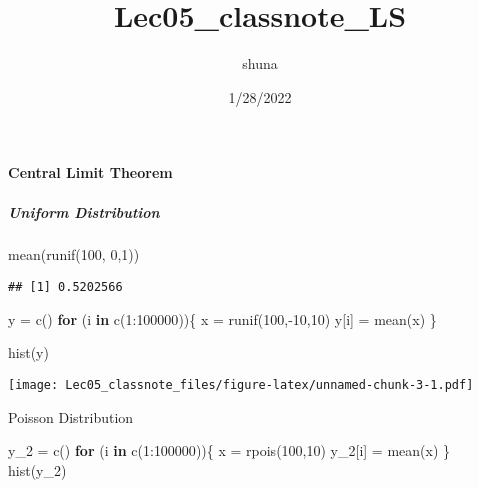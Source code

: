 \documentclass[
]{article}
\title{Lec05\_classnote\_LS}
\author{shuna}
\date{1/28/2022}
\newenvironment{Shaded}{\begin{snugshade}}{\end{snugshade}}
\newcommand{\ControlFlowTok}[1]{\textcolor[rgb]{0.13,0.29,0.53}{\textbf{#1}}}
\newcommand{\DecValTok}[1]{\textcolor[rgb]{0.00,0.00,0.81}{#1}}
\newcommand{\FunctionTok}[1]{\textcolor[rgb]{0.00,0.00,0.00}{#1}}
\newcommand{\NormalTok}[1]{#1}
\newcommand{\OtherTok}[1]{\textcolor[rgb]{0.56,0.35,0.01}{#1}}
\newcommand{\SpecialCharTok}[1]{\textcolor[rgb]{0.00,0.00,0.00}{#1}}
\begin{document}
\maketitle

\hypertarget{central-limit-theorem}{%
\paragraph{Central Limit Theorem}\label{central-limit-theorem}}

\hypertarget{uniform-distribution}{%
\subparagraph{Uniform Distribution}\label{uniform-distribution}}

\begin{Shaded}
\begin{Highlighting}[]
\FunctionTok{mean}\NormalTok{(}\FunctionTok{runif}\NormalTok{(}\DecValTok{100}\NormalTok{, }\DecValTok{0}\NormalTok{,}\DecValTok{1}\NormalTok{))}
\end{Highlighting}
\end{Shaded}

\begin{verbatim}
## [1] 0.5202566
\end{verbatim}

\begin{Shaded}
\begin{Highlighting}[]
\NormalTok{y }\OtherTok{=} \FunctionTok{c}\NormalTok{()}
\ControlFlowTok{for}\NormalTok{ (i }\ControlFlowTok{in} \FunctionTok{c}\NormalTok{(}\DecValTok{1}\SpecialCharTok{:}\DecValTok{100000}\NormalTok{))\{}
\NormalTok{  x }\OtherTok{=} \FunctionTok{runif}\NormalTok{(}\DecValTok{100}\NormalTok{,}\SpecialCharTok{{-}}\DecValTok{10}\NormalTok{,}\DecValTok{10}\NormalTok{)}
\NormalTok{  y[i] }\OtherTok{=} \FunctionTok{mean}\NormalTok{(x)}
\NormalTok{\}}
\end{Highlighting}
\end{Shaded}

\begin{Shaded}
\begin{Highlighting}[]
\FunctionTok{hist}\NormalTok{(y)}
\end{Highlighting}
\end{Shaded}

\texttt{[image: Lec05\_classnote\_files/figure-latex/unnamed-chunk-3-1.pdf]}

Poisson Distribution

\begin{Shaded}
\begin{Highlighting}[]
\NormalTok{y\_2 }\OtherTok{=} \FunctionTok{c}\NormalTok{()}
\ControlFlowTok{for}\NormalTok{ (i }\ControlFlowTok{in} \FunctionTok{c}\NormalTok{(}\DecValTok{1}\SpecialCharTok{:}\DecValTok{100000}\NormalTok{))\{}
\NormalTok{  x }\OtherTok{=} \FunctionTok{rpois}\NormalTok{(}\DecValTok{100}\NormalTok{,}\DecValTok{10}\NormalTok{)}
\NormalTok{  y\_2[i] }\OtherTok{=} \FunctionTok{mean}\NormalTok{(x)}
\NormalTok{\}}
\FunctionTok{hist}\NormalTok{(y\_2)}
\end{Highlighting}
\end{Shaded}
\end{document}
